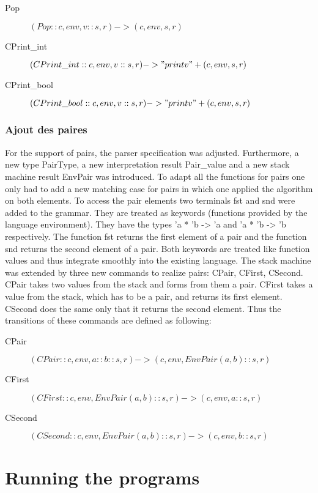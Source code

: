 \documentclass[a4paper, 12pt, titlepage]{article}
\begin{document}
\begin{description}
	\item[Pop] $(Pop::c, env, v::s, r) -> (c, env, s, r)$
	\item[CPrint\_int] $(CPrint\_int::c, env, v::s, r) -> "print v"+(c,env,s,r)$
	\item[CPrint\_bool] $(CPrint\_bool::c, env, v::s, r) -> "print v"+(c,env,s,r)$
\end{description}


\subsubsection{Ajout des paires}

For the support of pairs, the parser specification was adjusted. Furthermore, a new type PairType, a new interpretation result Pair\_value and a new stack machine result EnvPair was introduced. To adapt all the functions for pairs one only had to add a new matching case for pairs in which one applied the algorithm on both elements. To access the pair elements two terminals fst and snd were added to the grammar. They are treated as keywords (functions provided by the language environment). They have the types 'a * 'b -> 'a and 'a * 'b -> 'b respectively. The function fst returns the first element of a pair and the function snd returns the second element of a pair. Both keywords are treated like function values and thus integrate smoothly into the existing language. The stack machine was extended by three new commands to realize pairs: CPair, CFirst, CSecond. CPair takes two values from the stack and forms from them a pair. CFirst takes a value from the stack, which has to be a pair, and returns its first element. CSecond does the same only that it returns the second element. Thus the transitions of these commands are defined as following:

\begin{description}
	\item[CPair] $(CPair::c, env, a::b::s, r) -> (c, env, EnvPair(a,b)::s, r)$
	\item[CFirst] $(CFirst::c, env, EnvPair(a,b)::s, r) -> (c, env, a::s, r)$
	\item[CSecond] $(CSecond::c, env, EnvPair(a,b)::s, r) -> (c, env, b::s, r)$
\end{description}

\section{Running the programs}
\end{document}
